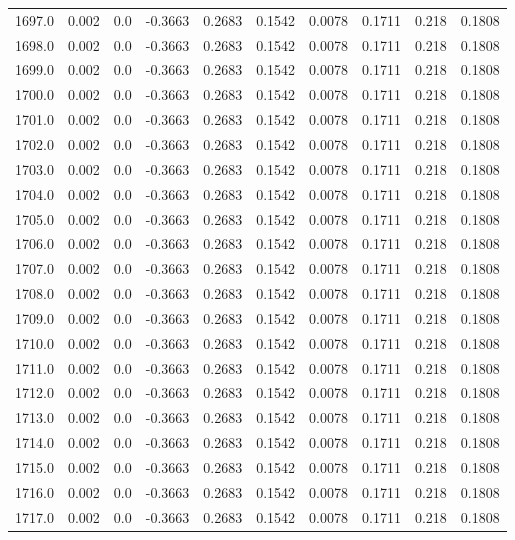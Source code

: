 \begin{longtable}{lrrrrrrrrr}
1697.0 & 0.002 & 0.0 & -0.3663 & 0.2683 & 0.1542 & 0.0078 & 0.1711 & 0.218 & 0.1808 \\
1698.0 & 0.002 & 0.0 & -0.3663 & 0.2683 & 0.1542 & 0.0078 & 0.1711 & 0.218 & 0.1808 \\
1699.0 & 0.002 & 0.0 & -0.3663 & 0.2683 & 0.1542 & 0.0078 & 0.1711 & 0.218 & 0.1808 \\
1700.0 & 0.002 & 0.0 & -0.3663 & 0.2683 & 0.1542 & 0.0078 & 0.1711 & 0.218 & 0.1808 \\
1701.0 & 0.002 & 0.0 & -0.3663 & 0.2683 & 0.1542 & 0.0078 & 0.1711 & 0.218 & 0.1808 \\
1702.0 & 0.002 & 0.0 & -0.3663 & 0.2683 & 0.1542 & 0.0078 & 0.1711 & 0.218 & 0.1808 \\
1703.0 & 0.002 & 0.0 & -0.3663 & 0.2683 & 0.1542 & 0.0078 & 0.1711 & 0.218 & 0.1808 \\
1704.0 & 0.002 & 0.0 & -0.3663 & 0.2683 & 0.1542 & 0.0078 & 0.1711 & 0.218 & 0.1808 \\
1705.0 & 0.002 & 0.0 & -0.3663 & 0.2683 & 0.1542 & 0.0078 & 0.1711 & 0.218 & 0.1808 \\
1706.0 & 0.002 & 0.0 & -0.3663 & 0.2683 & 0.1542 & 0.0078 & 0.1711 & 0.218 & 0.1808 \\
1707.0 & 0.002 & 0.0 & -0.3663 & 0.2683 & 0.1542 & 0.0078 & 0.1711 & 0.218 & 0.1808 \\
1708.0 & 0.002 & 0.0 & -0.3663 & 0.2683 & 0.1542 & 0.0078 & 0.1711 & 0.218 & 0.1808 \\
1709.0 & 0.002 & 0.0 & -0.3663 & 0.2683 & 0.1542 & 0.0078 & 0.1711 & 0.218 & 0.1808 \\
1710.0 & 0.002 & 0.0 & -0.3663 & 0.2683 & 0.1542 & 0.0078 & 0.1711 & 0.218 & 0.1808 \\
1711.0 & 0.002 & 0.0 & -0.3663 & 0.2683 & 0.1542 & 0.0078 & 0.1711 & 0.218 & 0.1808 \\
1712.0 & 0.002 & 0.0 & -0.3663 & 0.2683 & 0.1542 & 0.0078 & 0.1711 & 0.218 & 0.1808 \\
1713.0 & 0.002 & 0.0 & -0.3663 & 0.2683 & 0.1542 & 0.0078 & 0.1711 & 0.218 & 0.1808 \\
1714.0 & 0.002 & 0.0 & -0.3663 & 0.2683 & 0.1542 & 0.0078 & 0.1711 & 0.218 & 0.1808 \\
1715.0 & 0.002 & 0.0 & -0.3663 & 0.2683 & 0.1542 & 0.0078 & 0.1711 & 0.218 & 0.1808 \\
1716.0 & 0.002 & 0.0 & -0.3663 & 0.2683 & 0.1542 & 0.0078 & 0.1711 & 0.218 & 0.1808 \\
1717.0 & 0.002 & 0.0 & -0.3663 & 0.2683 & 0.1542 & 0.0078 & 0.1711 & 0.218 & 0.1808 \\

\end{longtable}
